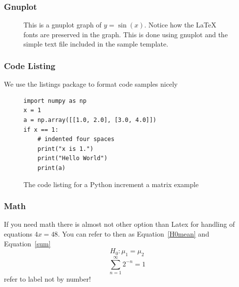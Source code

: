 \documentclass[screen, aspectratio=43]{beamer}
\begin{document}
\begin{frame}
  \frametitle{Gnuplot}
  
  

\begin{figure}[htp]  %
  \centering
  \scalebox{.7}{}
  \caption[An example graph.]{This is a gnuplot graph of $y=\sin(x)$. Notice how the \LaTeX{} fonts are preserved in the graph. This is done using gnuplot and the simple text file included in the sample template.}
  \label{fig:exgnuplotex}
\end{figure}

    \note{
  
    }

\end{frame}

\begin{frame}[fragile]
  \frametitle{Code Listing}
We use the listings package to format code samples nicely

  \begin{figure}[tp] 
  \centering
\lstset{language=Python}
\begin{lstlisting}
import numpy as np
x = 1
a = np.array([[1.0, 2.0], [3.0, 4.0]])
if x == 1:
    # indented four spaces
    print("x is 1.")
    print("Hello World")
    print(a)
\end{lstlisting}
  \caption[Python code example]{The code listing for a Python increment a matrix example}
  \label{fig:PythonCode}
\end{figure}

    \note{
    }

\end{frame}

\begin{frame}
\frametitle{Math}
If you need math there is almost not other option than Latex for handling of equations $4x = 48 $. You can refer to then as Equation~\ref{H0mean} and Equation~\ref{sum}
\begin{equation} 
\label{H0mean}
    H_0 : \mu_1 = \mu_2
\end{equation}
\begin{equation} 
\label{sum}
    \sum_{n=1}^{\infty} 2^{-n} = 1
\end{equation}
refer to label not by number!
\end{frame}
\end{document}

